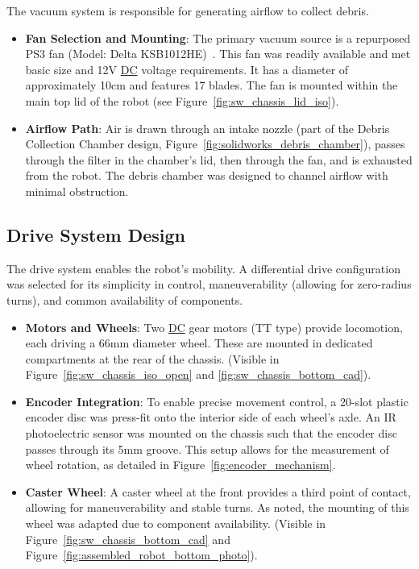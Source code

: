 The vacuum system is responsible for generating airflow to collect debris.
\begin{itemize}
    \item \textbf{Fan Selection and Mounting}: The primary vacuum source is a repurposed PS3 fan (Model: Delta KSB1012HE)~\cite{DeltaKSB1012HE_PSDevWiki}. This fan was readily available and met basic size and 12V \hyperref[term:dc]{DC} voltage requirements. It has a diameter of approximately 10cm and features 17 blades.
    The fan is mounted within the main top lid of the robot (see Figure~\ref{fig:sw_chassis_lid_iso}).
    \item \textbf{Airflow Path}: Air is drawn through an intake nozzle (part of the Debris Collection Chamber design, Figure~\ref{fig:solidworks_debris_chamber}), passes through the filter in the chamber's lid, then through the fan, and is exhausted from the robot. The debris chamber was designed to channel airflow with minimal obstruction.
\end{itemize}

\subsection{Drive System Design}
\label{subsec:drive_system_design_detailed}
The drive system enables the robot's mobility. A differential drive configuration was selected for its simplicity in control, maneuverability (allowing for zero-radius turns), and common availability of components.
\begin{itemize}
    \item \textbf{Motors and Wheels}: Two \hyperref[term:dc]{DC} gear motors (TT type) provide locomotion, each driving a 66mm diameter wheel. These are mounted in dedicated compartments at the rear of the chassis. (Visible in Figure~\ref{fig:sw_chassis_iso_open} and \ref{fig:sw_chassis_bottom_cad}).
    \item \textbf{Encoder Integration}: To enable precise movement control, a 20-slot plastic encoder disc was press-fit onto the interior side of each wheel's axle. An IR photoelectric sensor was mounted on the chassis such that the encoder disc passes through its 5mm groove. This setup allows for the measurement of wheel rotation, as detailed in Figure~\ref{fig:encoder_mechanism}.
    \item \textbf{Caster Wheel}: A caster wheel at the front provides a third point of contact, allowing for maneuverability and stable turns. As noted, the mounting of this wheel was adapted due to component availability. (Visible in Figure~\ref{fig:sw_chassis_bottom_cad} and Figure~\ref{fig:assembled_robot_bottom_photo}).
\end{itemize}

